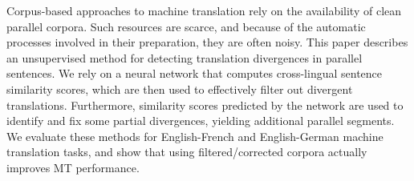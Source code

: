 Corpus-based approaches to machine translation rely on the availability of clean parallel corpora. Such resources are scarce, and because of the automatic processes involved in their preparation, they are often noisy. This paper describes an unsupervised method for detecting translation divergences in parallel sentences. We rely on a neural network that computes cross-lingual sentence similarity scores, which are then used to effectively filter out divergent translations. Furthermore, similarity scores predicted by the network are used to identify and fix some partial divergences, yielding additional parallel segments. We evaluate these methods for English-French and English-German machine translation tasks, and show that using filtered/corrected corpora actually improves MT performance.
